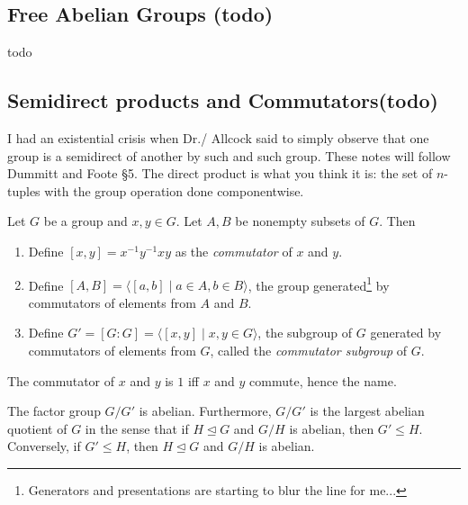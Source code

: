 \subsection{Free Abelian Groups (todo)}
todo
\subsection{Semidirect products and Commutators(todo)}
I had an existential crisis when Dr./ Allcock said to simply observe that one group is a semidirect of another by such and such group. These notes will follow Dummitt and Foote \S 5.
\orbreak
The direct product is what you think it is: the set of $n$-tuples with the group operation done componentwise.

\begin{definition}[Commutators]
    Let $G$ be a group and $x,y\in G$. Let $A,B$ be nonempty subsets of $G$. Then 
    \begin{enumerate}
        \item Define $[x,y]=x^{-1}y^{-1}xy$ as the \emph{commutator} of $x$ and $y$.
        \item Define $[A,B]=\langle [a,b] \mid a\in A,b\in B \rangle $, the group generated\footnote{Generators and presentations are starting to blur the line for me...} by commutators of elements from $A$ and $B$.
        \item Define $G'=[G:G]=\langle [x,y] \mid x,y\in G \rangle $, the subgroup of $G$ generated by commutators of elements from $G$, called the \emph{commutator subgroup} of $G$.
    \end{enumerate}
\end{definition}
The commutator of $x$ and $y$ is $1$ iff $x$ and $y$ commute, hence the name.
\begin{prop}
    The factor group $G /G'$ is abelian. Furthermore, $G /G'$ is the largest abelian quotient of $G$ in the sense that if $H \trianglelefteq G$ and $G /H$ is abelian, then $G'\leq H$. Conversely, if $G' \leq H$, then $H \trianglelefteq G$ and $G /H$ is abelian.
\end{prop}
